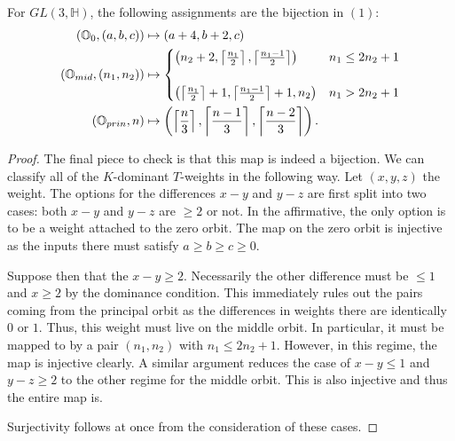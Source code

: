 \documentclass[10pt,a4paper]{amsart}
\newcommand{\HH}{\mathbb{H}}
\newcommand{\OO}{\mathbb{O}}
\begin{document}
\begin{theorem}
    For $ GL(3,\HH) $, the following assignments are the bijection in $
    (1): $
    \begin{align*}
        (\OO_0,(a,b,c))&\mapsto (a+4,b+2,c) \\
        (\OO_{mid}, (n_1,n_2))& \mapsto {%
        \begin{cases}
            \left(n_2+2,\left \lceil \frac{n_1}{2} \right\rceil, \left
            \lceil \frac{n_1-1}{2} \right\rceil\right) & n_1\leq 2n_2+1
            \\
            \; \\
            \left(\left \lceil \frac{n_1}{2} \right\rceil+1, \left
            \lceil \frac{n_1-1}{2} \right\rceil+1, n_2\right) & n_1>2n_2+1
        \end{cases}
        } \\
        (\OO_{prin},n)&\mapsto \left( \left \lceil \frac{n}{3} \right\rceil,
        \left \lceil \frac{n-1}{3} \right\rceil, \left \lceil \frac{n-2}
        {3} \right\rceil \right).
    \end{align*}
\end{theorem}

\begin{proof}
    The final piece to check is that this map is indeed a bijection.  We
    can classify all of the $ K $-dominant $ T $-weights in the
    following way.  Let $ (x,y,z) $ the weight.  The options for the
    differences $ x-y $ and $ y-z $ are first split into two cases:
    both $ x-y $ and $ y-z $ are $ \geq 2 $ or not.  In the affirmative,
    the only option is to be a weight attached to the zero orbit.  The
    map on the zero orbit is injective as the inputs there must satisfy $
    a\geq b\geq c\geq 0. $

    Suppose then that the $ x-y\geq 2. $ Necessarily the other
    difference must be $ \leq 1 $ and $ x\geq 2 $ by the dominance
    condition.  This immediately rules out the pairs coming from the
    principal orbit as the differences in weights there are identically $
    0 $ or $ 1. $ Thus, this weight must live on the middle orbit.  In
    particular, it must be mapped to by a pair $ (n_1,n_2) $ with $ n_1\leq
    2n_2+1. $ However, in this regime, the map is injective clearly.  A
    similar argument reduces the case of $ x-y\leq 1 $ and $ y-z\geq 2 $
    to the other regime for the middle orbit.  This is also injective
    and thus the entire map is.

    Surjectivity follows at once from the consideration of these cases.

\end{proof}
\end{document}
